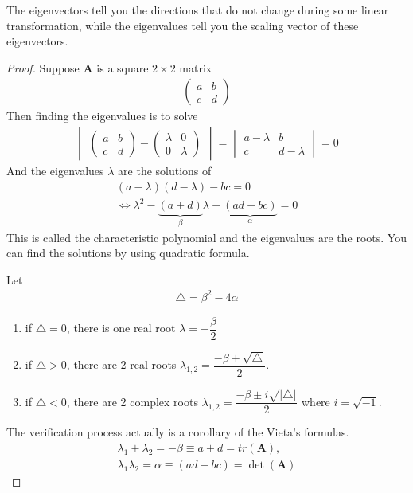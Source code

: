 \documentclass[11pt,a4paper]{book}
\theoremstyle{definition}\newtheorem{definition}{Definition}
\theoremstyle{definition}\newtheorem{fact}{Fact}
\theoremstyle{definition}\newtheorem{remark}{Remark}
\theoremstyle{definition}\newtheorem{ex}{Ex.}
\theoremstyle{definition}\newtheorem{project}{Project}
\theoremstyle{definition}\newtheorem{problem}{Problem}
\theoremstyle{definition}\newtheorem{example}{Example}
\numberwithin{theorem}{section}
\numberwithin{corollary}{chapter}
\numberwithin{assumption}{chapter}
\numberwithin{definition}{chapter}
\numberwithin{prop}{chapter}
\numberwithin{notation}{chapter}
\numberwithin{problem}{chapter}
\numberwithin{example}{chapter}
\numberwithin{fact}{chapter}
\numberwithin{ex}{chapter}
\def\A{\mathbf A}
\begin{document}
	The eigenvectors tell you the directions that do not change during some linear transformation, while the eigenvalues tell you the scaling vector of these eigenvectors. 
	
	\begin{proof}
		Suppose $\A$ is a square $2 \times 2$ matrix
		\begin{align*}
			\begin{pmatrix}
				a & b \\ c & d
			\end{pmatrix}
		\end{align*}
		Then finding the eigenvalues is to solve
		\begin{align*}
			\begin{vmatrix}
				\begin{pmatrix}
					a           & b \\ c & d
				\end{pmatrix} - 
				\begin{pmatrix}
					\lambda     & 0 \\ 0 & \lambda
				\end{pmatrix} 
			\end{vmatrix} = 
			\begin{vmatrix}
				a - \lambda & b \\ c & d-\lambda 
			\end{vmatrix} = 0
		\end{align*}
		And the eigenvalues $\lambda$ are the solutions of
		\begin{align}
			(a-\lambda)(d-\lambda) - bc = 0 \nonumber \\
			\Leftrightarrow \lambda^2 - \underbrace{(a+d)}_{\beta} \lambda + \underbrace{(ad-bc)}_{\alpha} = 0 \label{eigen}
		\end{align}
		This is called the characteristic polynomial and the eigenvalues are the roots. You can find the solutions by using quadratic formula.
		
		Let 
		\begin{align*}
			\triangle = \beta^2 - 4\alpha
		\end{align*}
		\begin{enumerate}
			\item if $\triangle= 0$, there is one real root $\lambda = - \dfrac{\beta}{2}$ 
			\item if $\triangle > 0$, there are 2 real roots $\lambda_{1,2} = \dfrac{-\beta \pm \sqrt{\triangle} }{2}$.
			\item if $\triangle < 0$, there are 2 complex roots $\lambda_{1,2} = \dfrac{-\beta \pm i \sqrt{|\triangle|} }{2}$ where $i = \sqrt{-1}$.
		\end{enumerate}
		The verification process actually is a corollary of the Vieta's formulas.
		\begin{align*}
			\lambda_1 + \lambda_2 = - \beta \equiv a + d = tr(\A), \\
			\lambda_1 \lambda_2 = \alpha \equiv (ad - bc) = \det(\A)
		\end{align*}
	\end{proof}
	
\end{document}
